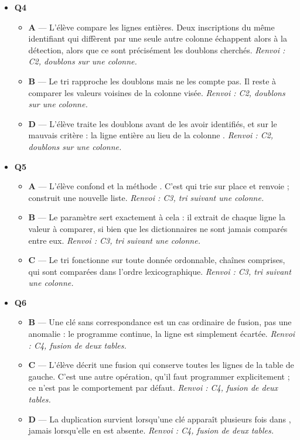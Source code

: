 \begin{itemize}
\begin{itemize}
    \item \textbf{D} — L'élève confond filtrer et concaténer. L'opérateur \code{+} allonge la table au lieu de la restreindre. \emph{Renvoi : C2, filtrage par compréhension.}
  \end{itemize}
  \item \textbf{Q4}
  \begin{itemize}
    \item \textbf{A} — L'élève compare les lignes entières. Deux inscriptions du même identifiant qui diffèrent par une seule autre colonne échappent alors à la détection, alors que ce sont précisément les doublons cherchés. \emph{Renvoi : C2, doublons sur une colonne.}
    \item \textbf{B} — Le tri rapproche les doublons mais ne les compte pas. Il reste à comparer les valeurs voisines de la colonne visée. \emph{Renvoi : C2, doublons sur une colonne.}
    \item \textbf{D} — L'élève traite les doublons avant de les avoir identifiés, et sur le mauvais critère : la ligne entière au lieu de la colonne . \emph{Renvoi : C2, doublons sur une colonne.}
  \end{itemize}
  \item \textbf{Q5}
  \begin{itemize}
    \item \textbf{A} — L'élève confond  et la méthode . C'est  qui trie sur place et renvoie  ;  construit une nouvelle liste. \emph{Renvoi : C3, tri suivant une colonne.}
    \item \textbf{B} — Le paramètre  sert exactement à cela : il extrait de chaque ligne la valeur à comparer, si bien que les dictionnaires ne sont jamais comparés entre eux. \emph{Renvoi : C3, tri suivant une colonne.}
    \item \textbf{C} — Le tri fonctionne sur toute donnée ordonnable, chaînes comprises, qui sont comparées dans l'ordre lexicographique. \emph{Renvoi : C3, tri suivant une colonne.}
  \end{itemize}
  \item \textbf{Q6}
  \begin{itemize}
    \item \textbf{B} — Une clé sans correspondance est un cas ordinaire de fusion, pas une anomalie : le programme continue, la ligne est simplement écartée. \emph{Renvoi : C4, fusion de deux tables.}
    \item \textbf{C} — L'élève décrit une fusion qui conserve toutes les lignes de la table de gauche. C'est une autre opération, qu'il faut programmer explicitement ; ce n'est pas le comportement par défaut. \emph{Renvoi : C4, fusion de deux tables.}
    \item \textbf{D} — La duplication survient lorsqu'une clé apparaît plusieurs fois dans , jamais lorsqu'elle en est absente. \emph{Renvoi : C4, fusion de deux tables.}
  \end{itemize}
\end{itemize}
\fi

